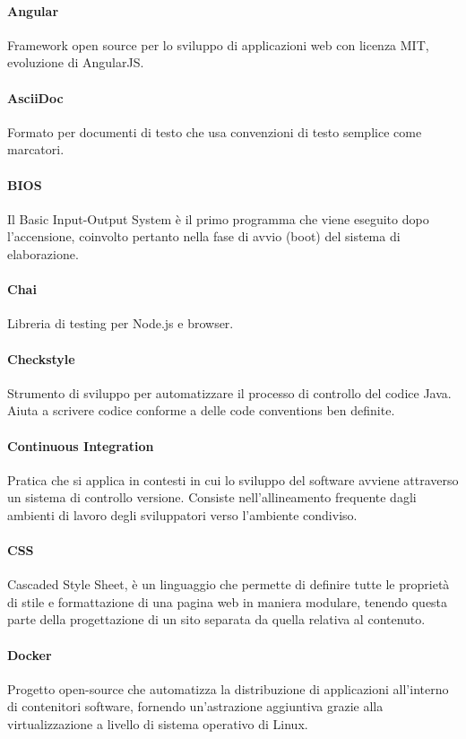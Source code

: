 	\paragraph*{Angular}
	Framework open source per lo sviluppo di applicazioni web con licenza MIT, evoluzione di AngularJS.
	
	\paragraph*{AsciiDoc}
	Formato per documenti di testo che usa convenzioni di testo semplice come marcatori.
	
	\paragraph*{BIOS}
	Il Basic Input-Output System è il primo programma che viene eseguito dopo l'accensione, coinvolto pertanto nella fase di avvio (boot) del sistema di elaborazione.
	
	\paragraph*{Chai}
	Libreria di testing per Node.js e browser.
	
	\paragraph*{Checkstyle}
	Strumento di sviluppo per automatizzare il processo di controllo del codice Java. Aiuta a scrivere codice conforme a delle code conventions ben definite.
	
	\paragraph*{Continuous Integration}
	Pratica che si applica in contesti in cui lo sviluppo del software avviene attraverso un sistema di controllo versione. Consiste nell'allineamento frequente dagli ambienti di lavoro degli sviluppatori verso l'ambiente condiviso.
	
	\paragraph*{CSS}
	Cascaded Style Sheet, è un linguaggio che permette di definire tutte le proprietà di stile e formattazione di una pagina web in maniera modulare, tenendo questa parte della progettazione di un sito separata da quella relativa al contenuto.
	
	\paragraph*{Docker}
	Progetto open-source che automatizza la distribuzione di applicazioni all'interno di contenitori software, fornendo un'astrazione aggiuntiva grazie alla virtualizzazione a livello di sistema operativo di Linux.
	

